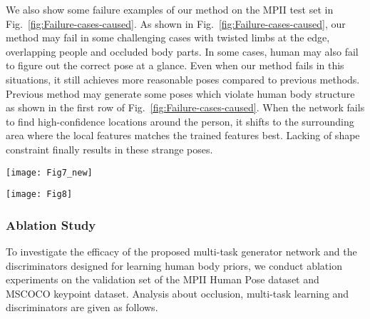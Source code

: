 \documentclass[10pt,journal,compsoc]{IEEEtran}
\begin{document}
We also show some failure examples of our method on the MPII test set in Fig.~\ref{fig:Failure-cases-caused}. As shown in Fig.~\ref{fig:Failure-cases-caused}, our method may fail in some challenging cases with twisted limbs at the edge, overlapping people and occluded body parts. In some cases, human may also fail to figure out the correct pose at a glance.
Even when our method fails in this situations, it still achieves more reasonable poses compared to previous methods.
Previous method may generate some poses which violate human body structure as shown in the first row of Fig.~\ref{fig:Failure-cases-caused}. When the network fails to find high-confidence locations around the person, it shifts to the surrounding area where the local features matches the trained features best. Lacking of shape constraint finally results in these strange  poses.



\begin{figure*}[t!]
\centering
\texttt{[image: Fig7\_new]}
%
\caption{Failure cases caused by body parts at the edge  (first and second columns), overlapping people (third column) and invisible limbs (the fourth column).
The results on the first and second rows are generated by our method and HG~\cite{conf/eccv/NewellYD16}, respectively.}
\label{fig:Failure-cases-caused}
\end{figure*}











\begin{figure*}[h!]
\centering
\texttt{[image: Fig8]}
%
\caption{(a) Input images with predicted poses; (b) Predicted pose heatmaps of four occluded body parts; (c) Predicted occlusion heatmaps of four occluded body parts; (d) Outputs values of \textit{P} (in blue) and \textit{C} (in green).
Red bars in the output of \textit{C} correspond to values of the four occluded body parts.}
\label{fig:Examples-inputs-and}
\end{figure*}

\subsubsection{Ablation Study}

To investigate the efficacy of the proposed multi-task generator network and the  discriminators designed for learning human body priors, we conduct ablation experiments on the validation set of the MPII Human Pose dataset and MSCOCO keypoint dataset. Analysis about occlusion, multi-task learning and discriminators are given as follows.
\end{document}

